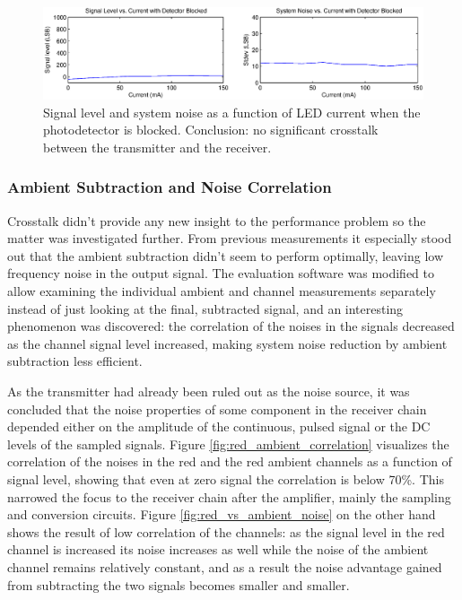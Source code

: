 \begin{figure}[htcb]
\begin{center}
  \includegraphics[scale=0.65]{kuvat/measurements/tx_rx_crosstalk.eps}
  \caption{Signal level and system noise as a function of LED current when the photodetector is blocked. Conclusion: no significant crosstalk between the transmitter and the receiver.}
  \label{fig:tx_rx_crosstalk}
\end{center}
\end{figure}

\subsubsection{Ambient Subtraction and Noise Correlation}

Crosstalk didn't provide any new insight to the performance problem so the matter was investigated further. From previous measurements it especially stood out that the ambient subtraction didn't seem to perform optimally, leaving low frequency noise in the output signal. The evaluation software was modified to allow examining the individual ambient and channel measurements separately instead of just looking at the final, subtracted signal, and an interesting phenomenon was discovered: the correlation of the noises in the signals decreased as the channel signal level increased, making system noise reduction by ambient subtraction less efficient.

As the transmitter had already been ruled out as the noise source, it was concluded that the noise properties of some component in the receiver chain depended either on the amplitude of the continuous, pulsed signal or the DC levels of the sampled signals. Figure \ref{fig:red_ambient_correlation} visualizes the correlation of the noises in the red and the red ambient channels as a function of signal level, showing that even at zero signal the correlation is below 70\%. This narrowed the focus to the receiver chain after the amplifier, mainly the sampling and conversion circuits. Figure \ref{fig:red_vs_ambient_noise} on the other hand shows the result of low correlation of the channels: as the signal level in the red channel is increased its noise increases as well while the noise of the ambient channel remains relatively constant, and as a result the noise advantage gained from subtracting the two signals becomes smaller and smaller.

